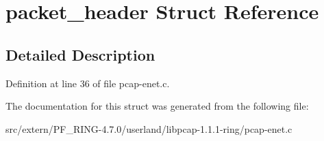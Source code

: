 \hypertarget{structpacket__header}{
\section{packet\_\-header Struct Reference}
\label{structpacket__header}
}


\subsection{Detailed Description}


Definition at line 36 of file pcap-\/enet.c.



The documentation for this struct was generated from the following file:\begin{DoxyCompactItemize}
\item 
src/extern/PF\_\-RING-\/4.7.0/userland/libpcap-\/1.1.1-\/ring/pcap-\/enet.c\end{DoxyCompactItemize}
